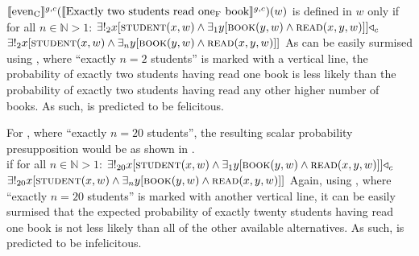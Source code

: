 \ex
$\intension[g,c]{even\textsubscript{C}}(\intension[g,c]{Exactly two students read one\textsubscript{F} book})(w)$ is defined in $w$ only if for all $n\in\mathbb{N}>1$: $\exists!_2{x}[\predicate{student}(x,w)\land\exists_1{y}[\predicate{book}(y,w)\land\predicate{read}(x,y,w)]]\lprob_c$\\\emptyfill$\exists!_2{x}[\predicate{student}(x,w)\land\exists_n{y}[\predicate{book}(y,w)\land\predicate{read}(x,y,w)]]$
\xe
As can be easily surmised using , where \enquote{exactly $n=2$ students} is marked with a vertical line, the probability of exactly two students having read one book is less likely than the probability of exactly two students having read any other higher number of books. As such,  is predicted to be felicitous.

For , where \enquote{exactly $n=20$ students}, the resulting scalar probability presupposition would be as shown in .
\ex
{}\\if for all $n\in\mathbb{N}>1$: $\exists!_{20}{x}[\predicate{student}(x,w)\land\exists_1{y}[\predicate{book}(y,w)\land\predicate{read}(x,y,w)]]\lprob_c$\\\emptyfill$\exists!_{20}{x}[\predicate{student}(x,w)\land\exists_n{y}[\predicate{book}(y,w)\land\predicate{read}(x,y,w)]]$
\xe
Again, using , where \enquote{exactly $n=20$ students} is marked with another vertical line, it can be easily surmised that the expected probability of exactly twenty students having read one book is not less likely than all of the other available alternatives. As such,  is predicted to be infelicitous.

